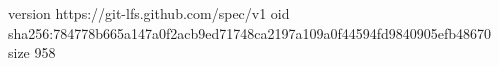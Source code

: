 version https://git-lfs.github.com/spec/v1
oid sha256:784778b665a147a0f2acb9ed71748ca2197a109a0f44594fd9840905efb48670
size 958
